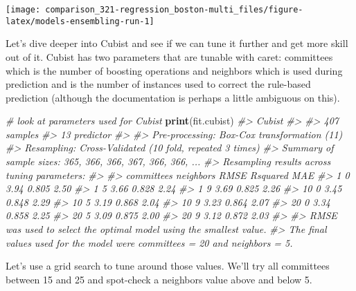 \documentclass[]{book}
\newenvironment{Shaded}{\begin{snugshade}}{\end{snugshade}}
\newcommand{\CommentTok}[1]{\textcolor[rgb]{0.56,0.35,0.01}{\textit{#1}}}
\newcommand{\KeywordTok}[1]{\textcolor[rgb]{0.13,0.29,0.53}{\textbf{#1}}}
\newcommand{\NormalTok}[1]{#1}
\begin{document}
\begin{center}\texttt{[image: comparison\_321-regression\_boston-multi\_files/figure-latex/models-ensembling-run-1]} \end{center}

Let's dive deeper into Cubist and see if we can tune it further and get more skill out of it. Cubist has two parameters that are tunable with caret: committees which is the number of boosting operations and neighbors which is used during prediction and is the number of instances used to correct the rule-based prediction (although the documentation is perhaps a little ambiguous on this).

\begin{Shaded}
\begin{Highlighting}[]
\CommentTok{# look at parameters used for Cubist}
\KeywordTok{print}\NormalTok{(fit.cubist)}
\CommentTok{#> Cubist }
\CommentTok{#> }
\CommentTok{#> 407 samples}
\CommentTok{#>  13 predictor}
\CommentTok{#> }
\CommentTok{#> Pre-processing: Box-Cox transformation (11) }
\CommentTok{#> Resampling: Cross-Validated (10 fold, repeated 3 times) }
\CommentTok{#> Summary of sample sizes: 365, 366, 366, 367, 366, 366, ... }
\CommentTok{#> Resampling results across tuning parameters:}
\CommentTok{#> }
\CommentTok{#>   committees  neighbors  RMSE  Rsquared  MAE }
\CommentTok{#>    1          0          3.94  0.805     2.50}
\CommentTok{#>    1          5          3.66  0.828     2.24}
\CommentTok{#>    1          9          3.69  0.825     2.26}
\CommentTok{#>   10          0          3.45  0.848     2.29}
\CommentTok{#>   10          5          3.19  0.868     2.04}
\CommentTok{#>   10          9          3.23  0.864     2.07}
\CommentTok{#>   20          0          3.34  0.858     2.25}
\CommentTok{#>   20          5          3.09  0.875     2.00}
\CommentTok{#>   20          9          3.12  0.872     2.03}
\CommentTok{#> }
\CommentTok{#> RMSE was used to select the optimal model using the smallest value.}
\CommentTok{#> The final values used for the model were committees = 20 and neighbors = 5.}
\end{Highlighting}
\end{Shaded}

Let's use a grid search to tune around those values. We'll try all committees between 15 and 25 and spot-check a neighbors value above and below 5.
\end{document}
